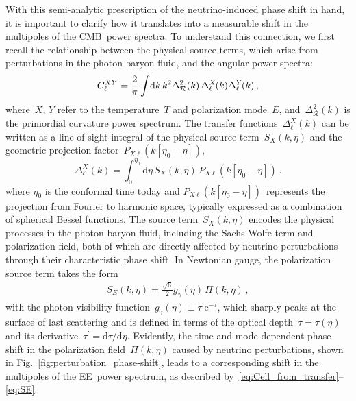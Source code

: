 \documentclass[11pt]{article}
\numberwithin{equation}{section}
\renewcommand{\d}{\mathrm{d}}
\newcommand{\ee}{\mathrm{e}}
\begin{document}
With this semi-analytic prescription of the neutrino-induced phase shift in hand, it is important to clarify how it translates into a measurable shift in the multipoles of the CMB~power spectra. To understand this connection, we first recall the relationship between the physical source terms, which arise from perturbations in the photon-baryon fluid, and the angular power spectra:
\begin{equation}
	C^{XY}_\ell = \frac{2}{\pi} \int\! \d k\, k^2 \Delta^2_{\mathcal{R}}(k) \,\Delta^X_\ell\hskip-1pt(k)\Delta^Y_\ell\hskip-1pt(k)\, ,	\label{eq:Cell_from_transfer}
\end{equation}
where~$X,\,Y$ refer to the temperature~$T$ and polarization mode~$E$, and~$\Delta^2_{\mathcal{R}}(k)$ is the primordial curvature power spectrum. The transfer functions~$\Delta^X_\ell(k)$ can be written as a line-of-sight integral of the physical source term~$S_X(k,\eta)$ and the geometric projection factor~$P_{X\ell}(k[\eta_0-\eta])$,
\begin{equation}
	\Delta^X_\ell(k) = \int_0^{\eta_0}\! \d\eta\,S_X(k,\eta)\,P_{X\ell}(k[\eta_0-\eta])\, .	\label{eq:transfers_from_sources}
\end{equation}
where $\eta_0$ is the conformal time today and $P_{X\ell}(k[\eta_0-\eta])$~represents the projection from Fourier to harmonic space, typically expressed as a combination of spherical Bessel functions. The source term~$S_X(k,\eta)$ encodes the physical processes in the photon-baryon fluid, including the Sachs-Wolfe term and polarization field, both of which are directly affected by neutrino perturbations through their characteristic phase shift. In Newtonian gauge, the polarization source term takes the form~\cite{Hu:1997hp}
\begin{align}
	S_E(k,\eta) = \frac{\sqrt{6}}{2} g_\gamma(\eta)\, \Pi(k,\eta)\, ,	\label{eq:SE}
\end{align}
with the photon visibility function~$g_\gamma(\eta) \equiv \tau^\prime \ee^{-\tau}$, which sharply peaks at the surface of last scattering and is defined in terms of the optical depth~$\tau = \tau(\eta)$ and its derivative~$\tau^\prime = \d\tau/\d\eta$. Evidently, the time and mode-dependent phase shift in the polarization field~$\Pi(k,\eta)$ caused by neutrino perturbations, shown in Fig.~\ref{fig:perturbation_phase-shift}, leads to a corresponding shift in the multipoles of the EE~power spectrum, as described by~\mbox{\eqref{eq:Cell_from_transfer}--\eqref{eq:SE}}.
\end{document}

